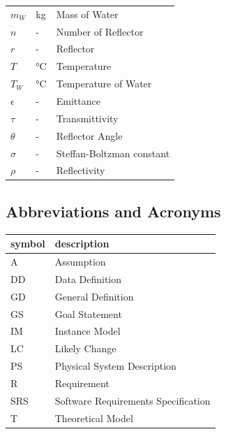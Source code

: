 \documentclass[12pt]{article}
\begin{document}
\begin{longtable*}{l l p{12cm}}
$m_W$ & \si{\kilogram} & Mass of Water \\

$n$ & - & Number of Reflector \\

$r$ & - & Reflector \\

$T$ & \si{\celsius} & Temperature\\

$T_W$ & \si{\celsius} & Temperature of Water\\

$\epsilon$ & - & Emittance \\

$\tau$ & - & Transmittivity \\

$\theta$ & - & Reflector Angle \\ 

$\sigma$ & - & Steffan-Boltzman constant \\

$\rho$ & - & Reflectivity \\

\bottomrule
\end{longtable*}

\subsection{Abbreviations and Acronyms}

\renewcommand{\arraystretch}{1.2}
\begin{tabular}{l l} 
  \toprule		
  \textbf{symbol} & \textbf{description}\\
  \midrule 
  A & Assumption\\
  DD & Data Definition\\
  GD & General Definition\\
  GS & Goal Statement\\
  IM & Instance Model\\
  LC & Likely Change\\
  PS & Physical System Description\\
  R & Requirement\\
  SRS & Software Requirements Specification\\
  T & Theoretical Model\\
  \bottomrule
\end{tabular}\\

\newpage

\end{document}
